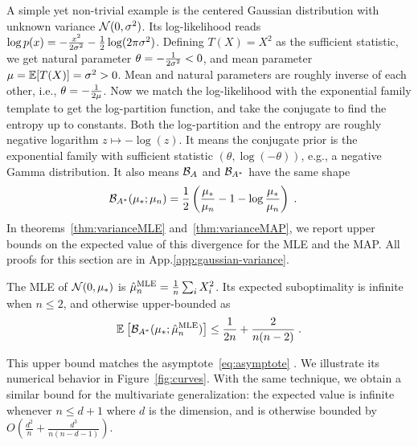 \documentclass[twoside]{article}
\newcommand*{\expect}[2][]{\ensuremath{\mathbb{E}_{#1} \left[ #2 \right] }} %
\newcommand{\logpart}{A}
\newcommand{\conj}{\logpart^*}
\newcommand{\bregman}{\cB_\logpart}
\newcommand{\bregmanconj}{\cB_{\logpart^*}}
\newcommand{\nat}{\theta}
\newcommand{\m}{\mu}
\begin{document}
A simple yet non-trivial example is the centered Gaussian distribution with unknown variance ${\mathcal N}(0,\sigma^2)$.
Its log-likelihood reads $\log p(x) = -\frac{x^2}{2 \sigma^2} - \frac{1}{2}\log(2\pi \sigma^2)$.
Defining $T(X)=X^2$ as the sufficient statistic, we get natural parameter $\nat = -\inv{2 \sigma^2} <0$, and mean parameter $\m=\E[T(X)] = \sigma^2 >0$.
Mean and natural parameters are roughly inverse of each other, i.e., $\nat = -\inv{2 \m}$. 
Now we match the log-likelihood with the exponential family template to get the log-partition function, and take the conjugate to find the entropy
\aligns{
	\logpart (\nat) = - \half \log(-\nat) \quad\text{and}\quad
	\conj(\m) = - \half \log(\m)  \; ,
}
up to constants.
Both the log-partition and  the entropy are roughly negative logarithm $z\mapsto - \log(z)$.
It means the conjugate prior is the exponential family with sufficient statistic $(\nat, \log(-\nat) )$, e.g., a negative Gamma distribution.
It also means $\bregman$ and $\bregmanconj$ have the same shape
\begin{align}
	\bregmanconj( \m_*; \m_n)
	&= \half \left ( \frac{\m_*}{ \m_n} - 1 - \log  \frac{\m_*}{ \m_n} \right) \; .
\end{align}
In theorems~\ref{thm:varianceMLE} and~\ref{thm:varianceMAP}, we report upper bounds on the expected value of this divergence for the MLE and the MAP.
All proofs for this section are in App.\ref{app:gaussian-variance}.
\begin{theorem}
\label{thm:varianceMLE}
	The MLE of $\cN(0,\m_*)$ is $\hat \m_n^\text{MLE} = \inv{n} \sum_i X_i^2 $.
	Its expected suboptimality is infinite when $n\leq 2$, and otherwise upper-bounded as
	\begin{align}
		 \expect{\bregmanconj( \m_*; \hat \m_n^\text{MLE}) }
			\leq \inv{2n} +\frac{2}{n(n-2)} \; .
			\label{eq:MLE_rate}
	\end{align}
\end{theorem}
This upper bound matches the asymptote~\eqref{eq:asymptote} .
We illustrate its numerical behavior in Figure~\ref{fig:curves}.
With the same technique, we obtain a similar bound for the multivariate generalization: the expected value is infinite whenever $n \leq d+1$ where $d$ is the dimension, and is otherwise bounded by $O(\frac{d^2}{n} + \frac{d^3}{n(n-d-1)} )$.
\end{document}
